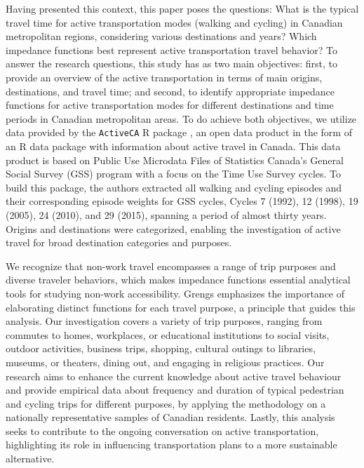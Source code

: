 \documentclass[preprint, 3p,
authoryear]{elsarticle} %
\begin{document}
Having presented this context, this paper poses the questions: What is
the typical travel time for active transportation modes (walking and
cycling) in Canadian metropolitan regions, considering various
destinations and years? Which impedance functions best represent active
transportation travel behavior? To answer the research questions, this
study has as two main objectives: first, to provide an overview of the
active transportation in terms of main origins, destinations, and travel
time; and second, to identify appropriate impedance functions for active
transportation modes for different destinations and time periods in
Canadian metropolitan areas. To do achieve both objectives, we utilize
data provided by the \texttt{ActiveCA} R package
\citep{dossantos2024ActiveCA}, an open data product in the form of an R
data package with information about active travel in Canada. This data
product is based on Public Use Microdata Files of Statistics Canada's
General Social Survey (GSS) program with a focus on the Time Use Survey
cycles. To build this package, the authors extracted all walking and
cycling episodes and their corresponding episode weights for GSS cycles,
Cycles 7 (1992), 12 (1998), 19 (2005), 24 (2010), and 29 (2015),
spanning a period of almost thirty years. Origins and destinations were
categorized, enabling the investigation of active travel for broad
destination categories and purposes.

We recognize that non-work travel encompasses a range of trip purposes
and diverse traveler behaviors, which makes impedance functions
essential analytical tools for studying non-work accessibility. Grengs
\citeyearpar{grengs2015nonwork} emphasizes the importance of elaborating
distinct functions for each travel purpose, a principle that guides this
analysis. Our investigation covers a variety of trip purposes, ranging
from commutes to homes, workplaces, or educational institutions to
social visits, outdoor activities, business trips, shopping, cultural
outings to libraries, museums, or theaters, dining out, and engaging in
religious practices. Our research aims to enhance the current knowledge
about active travel behaviour and provide empirical data about frequency
and duration of typical pedestrian and cycling trips for different
purposes, by applying the methodology on a nationally representative
samples of Canadian residents. Lastly, this analysis seeks to contribute
to the ongoing conversation on active transportation, highlighting its
role in influencing transportation plans to a more sustainable
alternative.
\end{document}
